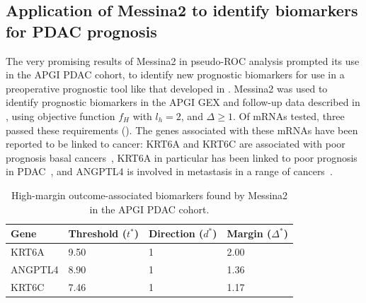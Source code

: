 \documentclass[dissertation.tex]{subfiles}
\begin{document}
\subsection{Application of Messina2 to identify biomarkers for \texorpdfstring{\acrshort{PDAC}}{PDAC} prognosis}
The very promising results of Messina2 in pseudo-ROC analysis prompted its use in the \gls{APGI} \gls{PDAC} cohort, to identify new prognostic biomarkers for use in a preoperative prognostic tool like that developed in .  Messina2 was used to identify prognostic biomarkers in the \gls{APGI} \gls{GEX} and follow-up data described in , using objective function $f_H$ with $l_h = 2$, and $\Delta \geq 1$.  Of  mRNAs tested, three passed these requirements ().  The genes associated with these mRNAs have been reported to be linked to cancer: KRT6A and KRT6C are associated with poor prognosis basal cancers~\cite{Choi2014,Livasy2006}, KRT6A in particular has been linked to poor prognosis in \gls{PDAC}~\cite{VandenBroeck2012}, and ANGPTL4 is involved in metastasis in a range of cancers~\cite{Adhikary2013,Kim2011b,Padua2008,Xiao2012}.

\begin{table}[h]
\centering
\caption[Outcome-associated biomarkers found by Messina2 in the \texorpdfstring{\acrshort{APGI}}{APGI} \texorpdfstring{\acrshort{PDAC}}{PDAC} cohort]{High-margin outcome-associated biomarkers found by Messina2 in the \acrshort{APGI} \acrshort{PDAC} cohort.}
\label{tab:mess-apgi-leads}
\begin{tabular}{@{}llll@{}}
\toprule
Gene    & Threshold ($t^*$) & Direction ($d^*$) & Margin ($\Delta^*$) \\ \midrule
KRT6A   & 9.50              & 1                 & 2.00                \\
ANGPTL4 & 8.90              & 1                 & 1.36                \\
KRT6C   & 7.46              & 1                 & 1.17                \\
\bottomrule
\end{tabular}
\end{table}
\end{document}
